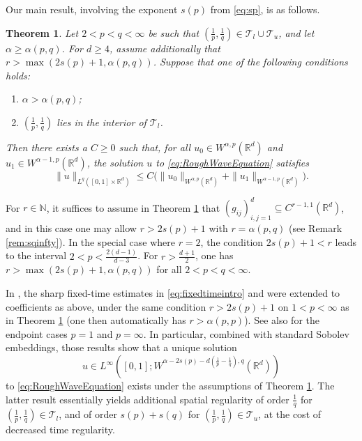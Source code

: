 \documentclass{amsart}
\numberwithin{equation}{section}
\newtheorem{theorem}{Theorem}[section]
\theoremstyle{definition}
\newcommand{\R}{\mathbb{R}}
\newcommand{\Rd}{\mathbb{R}^{d}}
\newcommand{\N}{\mathbb{N}}
\begin{document}
Our main result, involving the exponent $s(p)$ from \eqref{eq:sp}, is as follows. 

\begin{theorem}\label{thm:mainLpintro}
Let $2<p<q<\infty$ be such that $(\frac{1}{p},\frac{1}{q})\in\mathcal{T}_{l}\cup\mathcal{T}_{u}$, and let $\alpha \geq \alpha(p,q)$. For $d\geq 4$, assume additionally that 
$r>\max(2s(p)+1,\alpha(p,q))$. Suppose that one of the following conditions holds:
\begin{enumerate}
\item\label{it:mainLpintro1} $\alpha>\alpha(p,q)$; 
\item\label{it:mainLpintro2} $(\frac{1}{p},\frac{1}{q})$ lies in the interior of $\mathcal{T}_{l}$. 
\end{enumerate} 
Then there exists a $C\geq0$ such that, for all $u_{0}\in W^{\alpha,p}(\R^d)$ and $u_{1}\in W^{\alpha-1,p}(\R^d)$, the solution $u$ to \eqref{eq:RoughWaveEquation} satisfies 
\begin{equation}\label{eq:mainLpintro}
\|u\|_{L^{q}([0,1]\times \R^d)}\leq C\big(\|u_{0}\|_{W^{\alpha,p}(\R^d)}+\|u_{1}\|_{W^{\alpha-1,p}(\R^d)}).
\end{equation}
\end{theorem}

For $r\in \N$, it suffices to assume in Theorem \ref{thm:mainLpintro} that $(g_{ij})_{i,j=1}^{d}\subseteq C^{r-1,1}(\Rd)$, and in this case one may allow $r>2s(p)+1$ with $r=\alpha(p,q)$ (see Remark \ref{rem:sqinfty}). In the special case where $r=2$, the condition $2s(p)+1<r$ leads to the interval $2<p<\frac{2(d-1)}{d-3}$. For $r>\frac{d+1}{2}$, one has $r>\max(2s(p)+1,\alpha(p,q))$ for all $2<p<q<\infty$.

In \cite{HassellRozendaal2023}, the sharp fixed-time estimates in \eqref{eq:fixedtimeintro} and \cite{SeSoSt91} were extended to coefficients as above, under the same condition $r>2s(p)+1$ on $1<p<\infty$ as in Theorem \ref{thm:mainLpintro} (one then automatically has $r>\alpha(p,p)$). See also \cite{LiRoSo25a} for the endpoint cases $p=1$ and $p=\infty$. In particular, combined with standard Sobolev embeddings, those results show that a unique solution
\[
u\in L^{\infty}([0,1];W^{\alpha-2s(p)-d(\frac{1}{p}-\frac{1}{q}),q}(\Rd))
\]
to \eqref{eq:RoughWaveEquation} exists under the assumptions of Theorem \ref{thm:mainLpintro}. The latter result essentially yields additional spatial regularity of order $\frac{1}{q}$ for $(\frac{1}{p},\frac{1}{q})\in \mathcal{T}_{l}$, and of order $s(p)+s(q)$ for $(\frac{1}{p},\frac{1}{q})\in \mathcal{T}_{u}$, at the cost of decreased time regularity.
\end{document}
